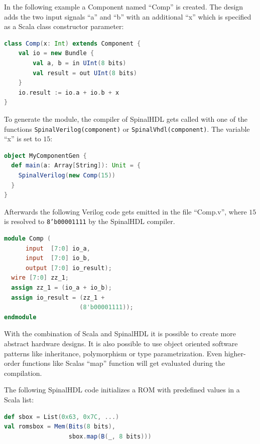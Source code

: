 \documentclass[twoside,twocolumn]{article}
\newcommand{\code}[1]{\texttt{#1}}
\begin{document}
In the following example a Component named ``Comp'' is created. The
design adds the two input signals ``a'' and ``b'' with an additional
``x'' which is specified as a Scala class constructor parameter: 
\begin{lstlisting}[language=scala]
class Comp(x: Int) extends Component {
    val io = new Bundle {
        val a, b = in UInt(8 bits)
        val result = out UInt(8 bits)
    }
    io.result := io.a + io.b + x
}
\end{lstlisting}
To generate the module, the compiler of SpinalHDL gets called with one of
the functions \code{SpinalVerilog(component)} or
\code{SpinalVhdl(component)}. The variable ``x'' is set to $15$:
\begin{lstlisting}[language=scala]
object MyComponentGen {
  def main(a: Array[String]): Unit = {
    SpinalVerilog(new Comp(15))
  }
}
\end{lstlisting}
Afterwards the following Verilog code gets emitted in the file
``Comp.v'', where $15$ is resolved to \code{8’b00001111} by the
SpinalHDL compiler.
\begin{lstlisting}[language=verilog]
module Comp (
      input  [7:0] io_a,
      input  [7:0] io_b,
      output [7:0] io_result);
  wire [7:0] zz_1;
  assign zz_1 = (io_a + io_b);
  assign io_result = (zz_1 + 
                     (8'b00001111));
endmodule
\end{lstlisting}
With the combination of Scala and SpinalHDL it is possible to create
more abstract hardware designs. It is also possible to use object
oriented software patterns like inheritance, polymorphism or type
parametrization. Even higher-order functions like Scalas ``map''
function will get evaluated during the compilation.

The following SpinalHDL code initializes a ROM with predefined values in
a Scala list:
\begin{lstlisting}[language=scala]
def sbox = List(0x63, 0x7C, ...)
val romsbox = Mem(Bits(8 bits), 
                  sbox.map(B(_, 8 bits)))
\end{lstlisting}
\end{document}
